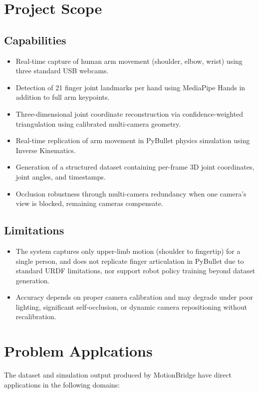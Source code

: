 \section{Project Scope}
\subsection{Capabilities}
\begin{itemize}
    \item Real-time capture of human arm movement (shoulder, elbow, wrist) using three standard USB webcams.
    \item Detection of 21 finger joint landmarks per hand using MediaPipe Hands in addition to full arm keypoints.
    \item Three-dimensional joint coordinate reconstruction via confidence-weighted triangulation using calibrated multi-camera geometry.
    \item Real-time replication of arm movement in PyBullet physics simulation using Inverse Kinematics.
    \item Generation of a structured dataset containing per-frame 3D joint coordinates, joint angles, and timestamps.
    \item Occlusion robustness through multi-camera redundancy when one camera's view is blocked, remaining cameras compensate.
\end{itemize}

\subsection{Limitations}
\begin{itemize}
    \item The system captures only upper-limb motion (shoulder to fingertip) for a single person, and does not replicate finger articulation in PyBullet due to standard URDF limitations, nor support robot policy training beyond dataset generation.
    \item Accuracy depends on proper camera calibration and may degrade under poor lighting, significant self-occlusion, or dynamic camera repositioning without recalibration.
\end{itemize}

\section{Problem Applcations}
The dataset and simulation output produced by MotionBridge have direct applications in the following domains:
 
